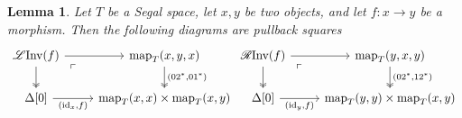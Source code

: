 \documentclass[11pt, a4paper]{amsart}
\newcommand{\map}{\mathrm{map}}
\newcommand{\id}{\mathrm{id}}
\newcommand{\LInv}{\mathscr{L}\mathrm{Inv}}
\newcommand{\RInv}{\mathscr{R}\mathrm{Inv}}
\newtheorem{lemma}[equation]{Lemma}
\theoremstyle{definition}
\theoremstyle{remark}
\numberwithin{equation}{section}
\begin{document}
\begin{lemma} \label{lemma:linv rinv local}
  Let $T$ be a Segal space, let $x,y$ be two objects, and let $f\colon x \to y$ be a morphism. Then the following diagrams are pullback squares
\[
\begin{tikzcd}
\LInv(f) \arrow[r] \arrow[d, twoheadrightarrow] \arrow[dr, phantom, "\ulcorner", very near start] & \map_T(x,y,x) \arrow[d, "{(02^*,01^*)}", twoheadrightarrow] \\
\Delta[0] \arrow[r, "{(\id_x , f)}"'] & \map_T(x,x) \times \map_T(x,y)
\end{tikzcd}
\begin{tikzcd}
\RInv(f) \arrow[r] \arrow[d, twoheadrightarrow] \arrow[dr, phantom, "\ulcorner", very near start] & \map_T(y,x,y) \arrow[d, "{(02^*,12^*)}", twoheadrightarrow] \\
\Delta[0] \arrow[r, "{(\id_y , f)}"'] & \map_T(y,y) \times \map_T(x,y)
\end{tikzcd}
\]
\end{lemma}
\end{document}
